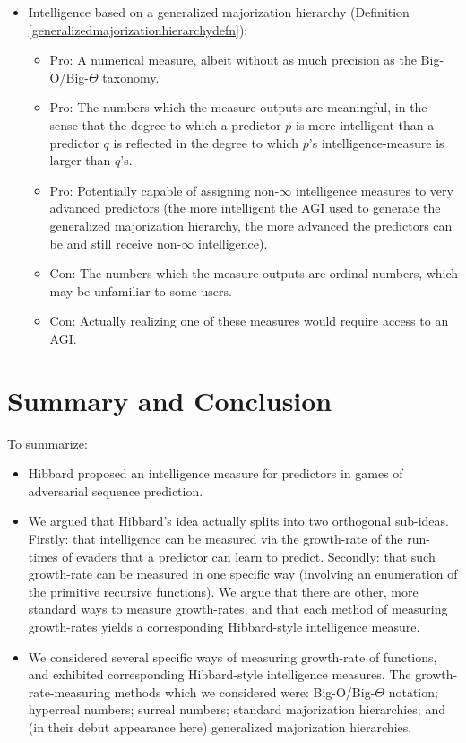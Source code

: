 \documentclass{article}
\begin{document}
\begin{itemize}
    \item
    Intelligence based on a generalized majorization hierarchy
    (Definition \ref{generalizedmajorizationhierarchydefn}):
    \begin{itemize}
        \item
        Pro: A numerical measure, albeit without as much precision as the
        Big-O/Big-$\Theta$ taxonomy.
        \item
        Pro: The numbers which the measure outputs are meaningful, in the sense that
        the degree to which a predictor $p$ is more
        intelligent than a predictor $q$ is reflected
        in the degree to which $p$'s intelligence-measure is larger than $q$'s.
        \item
        Pro: Potentially capable of assigning non-$\infty$ intelligence measures to
        very advanced predictors (the more intelligent the AGI used to generate the
        generalized majorization hierarchy, the more advanced the predictors can be
        and still receive non-$\infty$ intelligence).
        \item
        Con: The numbers which the measure outputs are ordinal numbers, which may be
        unfamiliar to some users.
        \item
        Con: Actually realizing one of these measures would require access to an AGI.
    \end{itemize}
\end{itemize}

\section{Summary and Conclusion}
\label{conclusionsection}

To summarize:
\begin{itemize}
    \item
    Hibbard proposed \cite{hibbard} an intelligence measure for predictors
    in games of adversarial sequence prediction.
    \item
    We argued that Hibbard's idea actually splits into two orthogonal sub-ideas.
    Firstly: that intelligence can be measured via the growth-rate of the run-times
    of evaders that a predictor can learn to predict. Secondly: that such growth-rate can
    be measured in one specific way (involving an enumeration of the primitive recursive
    functions). We argue that there are other, more standard ways to measure growth-rates,
    and that each method of measuring growth-rates yields a corresponding Hibbard-style
    intelligence measure.
    \item
    We considered several specific ways of measuring growth-rate of functions, and exhibited
    corresponding Hibbard-style intelligence measures. The growth-rate-measuring methods
    which we considered were: Big-O/Big-$\Theta$ notation; hyperreal numbers;
    surreal numbers; standard majorization hierarchies; and (in their debut appearance here)
    generalized majorization hierarchies.
\end{itemize}




\end{document}
